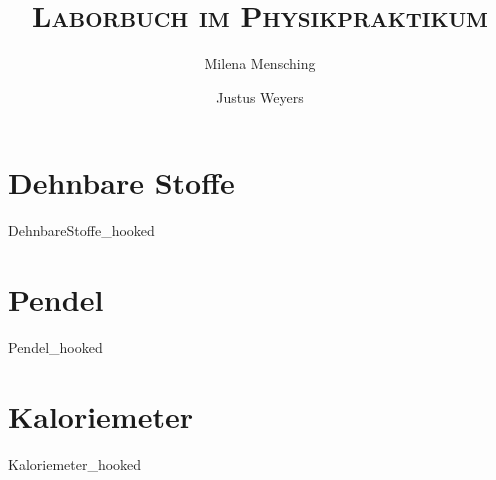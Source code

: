 

\title{\textsc{Laborbuch im Physikpraktikum}}
\author{Milena Mensching \and Justus Weyers}


	\maketitle
	\newpage	
    \tableofcontents
    \newpage
    
    \part{Dehnbare Stoffe}
	{DehnbareStoffe_hooked}
	
	\part{Pendel}
	{Pendel_hooked}

	\part{Kaloriemeter}
	{Kaloriemeter_hooked}
	
	\newpage
    
    
	\newpage
	\listoffigures
	\listoftables

